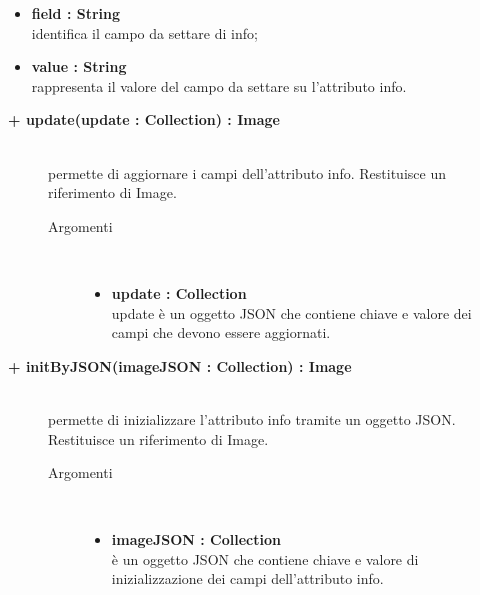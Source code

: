 \begin{description}
\begin{description}
\begin{description}
\begin{itemize}
					\item \textbf{field : String			} \hfill \\
					identifica il campo da settare di info;
					\item \textbf{value : String			} \hfill \\
					rappresenta il valore del campo da settare su l'attributo info.
				\end{itemize}
		\end{description}

\end{description}

\begin{description}
		\item[\textbf{\color{blue}+ update(update : Collection) : Image			}] \hfill \\
			permette di aggiornare i campi dell'attributo info. Restituisce un riferimento di Image.
			
		\begin{description}
			\item[Argomenti] \hfill \\
				\begin{itemize}
				
					\item \textbf{update : Collection			} \hfill \\
					update è un oggetto JSON che contiene chiave e valore dei campi che devono essere aggiornati. 
				\end{itemize}
		\end{description}

\end{description}

\begin{description}
		\item[\textbf{\color{blue}+ initByJSON(imageJSON : Collection) : Image			}] \hfill \\
			permette di inizializzare l'attributo info tramite un oggetto JSON. Restituisce un riferimento di Image.
			
		\begin{description}
			\item[Argomenti] \hfill \\
				\begin{itemize}
				
					\item \textbf{imageJSON : Collection			} \hfill \\
					è un oggetto JSON che contiene chiave e valore di inizializzazione dei campi dell'attributo info. 
				\end{itemize}
		\end{description}


\end{description}
\end{description}
